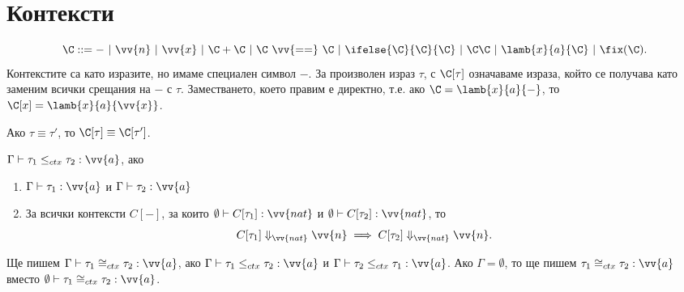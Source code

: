 \section{Контексти}


\[\C ::= -\ |\ \vv{n}\ |\ \vv{x}\ |\ \C + \C\ |\ \C\ \vv{==}\ \C\ |\ \ifelse{\C}{\C}{\C}\ |\ \C\C\ |\ \lamb{x}{a}{\C}\ |\ \fix(\C).\]
Контекстите са като изразите, но имаме специален символ $-$.
За произволен израз $\tau$, с $\C[\tau]$ означаваме израза, който се получава като
заменим всички срещания на $-$ с $\tau$. Заместването, което правим е директно, т.е.
ако $\C = \lamb{x}{a}{-}$, то $\C[x] = \lamb{x}{a}{\vv{x}}$.

\begin{proposition}
  Ако $\tau \equiv \tau'$, то $\C[\tau] \equiv \C[\tau']$.
\end{proposition}



\begin{definition}
  $\Gamma \vdash \tau_1 \leq_{ctx} \tau_2 : \vv{a}$, ако
  \begin{enumerate}[1)]
  \item
    $\Gamma \vdash \tau_1 : \vv{a}$ и $\Gamma \vdash \tau_2 : \vv{a}$
  \item
    За всички контексти $C[-]$, за които $\emptyset \vdash C[\tau_1] : \vv{nat}$ и $\emptyset \vdash C[\tau_2] : \vv{nat}$, то
    \[C[\tau_1] \Downarrow_{\vv{nat}} \vv{n} \implies C[\tau_2] \Downarrow_{\vv{nat}} \vv{n}.\]
  \end{enumerate}  
\end{definition}

Ще пишем $\Gamma \vdash \tau_1 \cong_{ctx} \tau_2 : \vv{a}$, ако
$\Gamma \vdash \tau_1 \leq_{ctx} \tau_2 : \vv{a}$ и $\Gamma \vdash \tau_2 \leq_{ctx} \tau_1 : \vv{a}$.
Ако $\Gamma = \emptyset$, то ще пишем $\tau_1 \cong_{ctx} \tau_2 : \vv{a}$ вместо $\emptyset \vdash \tau_1 \cong_{ctx} \tau_2 : \vv{a}$.


